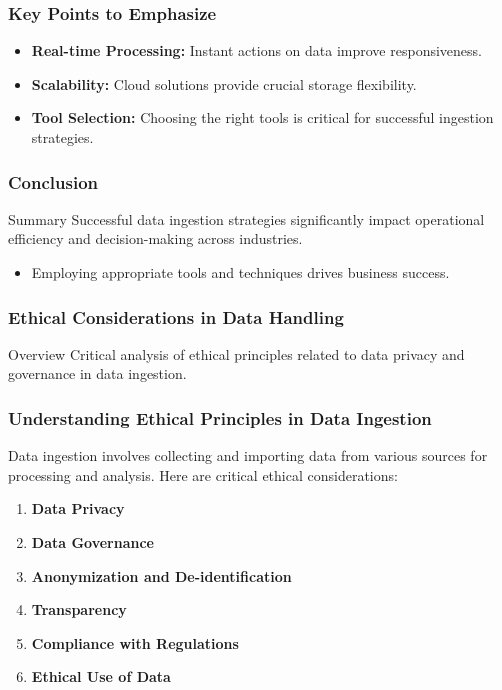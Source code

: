\documentclass[aspectratio=169]{beamer}
\begin{document}
\begin{frame}[fragile]
    \frametitle{Key Points to Emphasize}
    \begin{itemize}
        \item \textbf{Real-time Processing:} Instant actions on data improve responsiveness.
        \item \textbf{Scalability:} Cloud solutions provide crucial storage flexibility.
        \item \textbf{Tool Selection:} Choosing the right tools is critical for successful ingestion strategies.
    \end{itemize}
\end{frame}

\begin{frame}[fragile]
    \frametitle{Conclusion}
    \begin{block}{Summary}
        Successful data ingestion strategies significantly impact operational efficiency and decision-making across industries. 
        \begin{itemize}
            \item Employing appropriate tools and techniques drives business success.
        \end{itemize}
    \end{block}
\end{frame}

\begin{frame}[fragile]
    \frametitle{Ethical Considerations in Data Handling}
    \begin{block}{Overview}
        Critical analysis of ethical principles related to data privacy and governance in data ingestion.
    \end{block}
\end{frame}

\begin{frame}[fragile]
    \frametitle{Understanding Ethical Principles in Data Ingestion}
    Data ingestion involves collecting and importing data from various sources for processing and analysis. Here are critical ethical considerations:
    \begin{enumerate}
        \item \textbf{Data Privacy}
        \item \textbf{Data Governance}
        \item \textbf{Anonymization and De-identification}
        \item \textbf{Transparency}
        \item \textbf{Compliance with Regulations}
        \item \textbf{Ethical Use of Data}
    \end{enumerate}
\end{frame}
\end{document}
